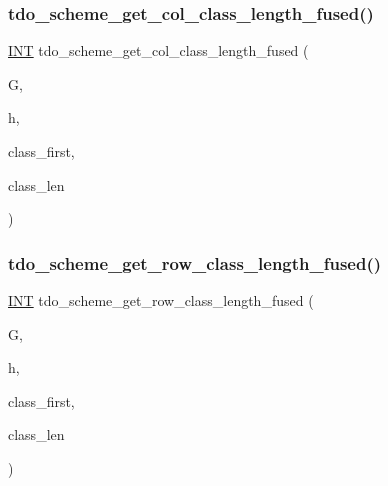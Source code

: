 \subsubsection{\texorpdfstring{tdo\+\_\+scheme\+\_\+get\+\_\+col\+\_\+class\+\_\+length\+\_\+fused()}{tdo\_scheme\_get\_col\_class\_length\_fused()}}
{\footnotesize\ttfamily \mbox{\hyperlink{galois_8h_a09fddde158a3a20bd2dcadb609de11dc}{I\+NT}} tdo\+\_\+scheme\+\_\+get\+\_\+col\+\_\+class\+\_\+length\+\_\+fused (\begin{DoxyParamCaption}\item[{\mbox{\hyperlink{classtdo__scheme}{tdo\+\_\+scheme}} \&}]{G,  }\item[{\mbox{\hyperlink{galois_8h_a09fddde158a3a20bd2dcadb609de11dc}{I\+NT}}}]{h,  }\item[{\mbox{\hyperlink{galois_8h_a09fddde158a3a20bd2dcadb609de11dc}{I\+NT}}}]{class\+\_\+first,  }\item[{\mbox{\hyperlink{galois_8h_a09fddde158a3a20bd2dcadb609de11dc}{I\+NT}}}]{class\+\_\+len }\end{DoxyParamCaption})}

\mbox{\label{geo__parameter_8_c_abde647e006f2bca65e5445d00c7d641b}} 
\subsubsection{\texorpdfstring{tdo\+\_\+scheme\+\_\+get\+\_\+row\+\_\+class\+\_\+length\+\_\+fused()}{tdo\_scheme\_get\_row\_class\_length\_fused()}}
{\footnotesize\ttfamily \mbox{\hyperlink{galois_8h_a09fddde158a3a20bd2dcadb609de11dc}{I\+NT}} tdo\+\_\+scheme\+\_\+get\+\_\+row\+\_\+class\+\_\+length\+\_\+fused (\begin{DoxyParamCaption}\item[{\mbox{\hyperlink{classtdo__scheme}{tdo\+\_\+scheme}} \&}]{G,  }\item[{\mbox{\hyperlink{galois_8h_a09fddde158a3a20bd2dcadb609de11dc}{I\+NT}}}]{h,  }\item[{\mbox{\hyperlink{galois_8h_a09fddde158a3a20bd2dcadb609de11dc}{I\+NT}}}]{class\+\_\+first,  }\item[{\mbox{\hyperlink{galois_8h_a09fddde158a3a20bd2dcadb609de11dc}{I\+NT}}}]{class\+\_\+len }\end{DoxyParamCaption})}

